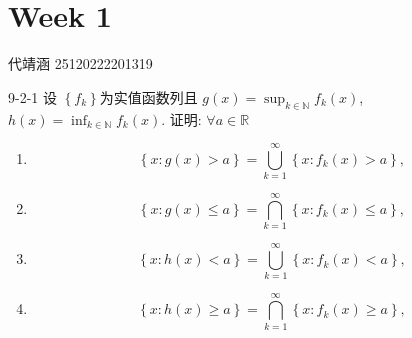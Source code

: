 \documentclass[../main.tex]{subfiles}
\begin{document}
\chapter{ Week 1 }

代靖涵 25120222201319

\begin{exercise}{}{9-2-1}
     设 \(  \left\{ f_{k} \right\}  \)为实值函数列且 \(  g\left( x \right)= \sup _{k\in \mathbb{N} }f_{k}\left( x \right)    \), \(  h\left( x \right)= \inf _{k\in \mathbb{N} }f_{k}\left( x \right)    \). 证明: \(  \forall a\in \mathbb{R}   \)
    \begin{enumerate}
        \item \[
        \left\{ x:g\left( x \right)> a  \right\}= \bigcup _{k= 1}^{\infty}\left\{ x:f_{k}\left( x \right)> a  \right\},
        \]
        \item \[
        \left\{ x: g\left( x \right)\le a  \right\}= \bigcap_{k= 1}^{\infty}\left\{ x:f_{k}\left( x \right)\le a  \right\} ,
        \]
        \item \[
        \left\{ x:h\left( x \right)< a  \right\}= \bigcup _{k= 1}^{\infty}\left\{ x:f_{k}\left( x \right)< a  \right\},
        \]
        \item \[
        \left\{ x:h\left( x \right)\ge a  \right\}= \bigcap_{k= 1}^{\infty}\left\{ x:f_{k}\left( x \right)\ge a  \right\} ,
        \]
    \end{enumerate}
        
\end{exercise}
\end{document}
